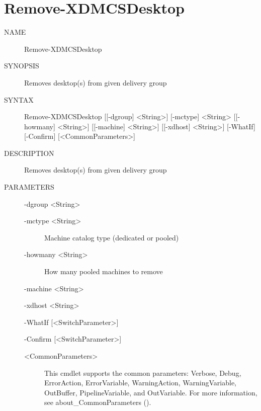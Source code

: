 \documentclass[letterpaper,10pt,english]{sphinxmanual}
\begin{document}
\section{Remove-XDMCSDesktop}
\label{\detokenize{cmd_remove:remove-xdmcsdesktop}}\begin{description}
\item[{NAME}] \leavevmode
Remove-XDMCSDesktop

\item[{SYNOPSIS}] \leavevmode
Removes desktop(s) from given delivery group

\item[{SYNTAX}] \leavevmode
Remove-XDMCSDesktop {[}{[}-dgroup{]} \textless{}String\textgreater{}{]} {[}-mctype{]} \textless{}String\textgreater{} {[}{[}-howmany{]} \textless{}String\textgreater{}{]} {[}{[}-machine{]} \textless{}String\textgreater{}{]} {[}{[}-xdhost{]} \textless{}String\textgreater{}{]} {[}-WhatIf{]} {[}-Confirm{]} {[}\textless{}CommonParameters\textgreater{}{]}

\item[{DESCRIPTION}] \leavevmode
Removes desktop(s) from given delivery group

\item[{PARAMETERS}] \leavevmode
-dgroup \textless{}String\textgreater{}
\begin{description}
\item[{-mctype \textless{}String\textgreater{}}] \leavevmode
Machine catalog type (dedicated or pooled)

\item[{-howmany \textless{}String\textgreater{}}] \leavevmode
How many pooled machines to remove

\end{description}

-machine \textless{}String\textgreater{}

-xdhost \textless{}String\textgreater{}

-WhatIf {[}\textless{}SwitchParameter\textgreater{}{]}

-Confirm {[}\textless{}SwitchParameter\textgreater{}{]}
\begin{description}
\item[{\textless{}CommonParameters\textgreater{}}] \leavevmode
This cmdlet supports the common parameters: Verbose, Debug,
ErrorAction, ErrorVariable, WarningAction, WarningVariable,
OutBuffer, PipelineVariable, and OutVariable. For more information, see
about\_CommonParameters ().


\end{description}
\end{description}
\end{document}
